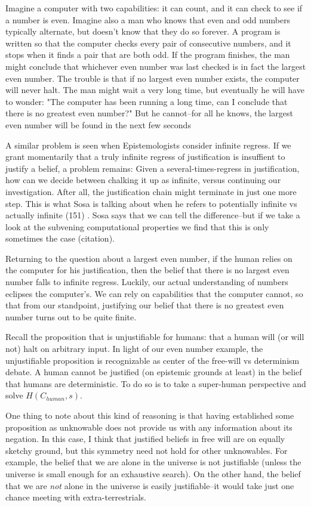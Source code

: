 \documentclass[12pt]{article}
\begin{document}
\begin{flushleft}
Imagine a computer with two capabilities: it can count, and it can check to see if a number is even.
Imagine also a man who knows that even and odd numbers typically alternate, but doesn't know that they do so forever.
A program is written so that the computer checks every pair of consecutive numbers, and it stops when it finds a pair that are both odd.
If the program finishes, the man might conclude that whichever even number was last checked is in fact the largest even number.
The trouble is that if no largest even number exists, the computer will never halt.
The man might wait a very long time, but eventually he will have to wonder: "The computer has been running a long time, can I conclude that there is no greatest even number?"
But he cannot--for all he knows, the largest even number will be found in the next few seconds

A similar problem is seen when Epistemologists consider infinite regress.
If we grant momentarily that a truly infinite regress of justification is insuffient to justify a belief, a problem remains:
Given a several-times-regress in justification, how can we decide between chalking it up as infinite, versus continuing our investigation.
After all, the justification chain might terminate in just one more step.
This is what Sosa is talking about when he refers to potentially infinite vs actually infinite (151) .
Sosa says that we can tell the difference--but if we take a look at the subvening computational properties we find that this is only sometimes the case (citation).

Returning to the question about a largest even number, if the human relies on the computer for his justification, then the belief that there is no largest even number falls to infinite regress.
Luckily, our actual understanding of numbers eclipses the computer's.
We can rely on capabilities that the computer cannot, so that from our standpoint, justifying our belief that there is no greatest even number turns out to be quite finite.

Recall the proposition that is unjustifiable for humans: that a human will (or will not) halt on arbitrary input.
In light of our even number example, the unjustifiable proposition is recognizable as center of the free-will vs determinism debate.
A human cannot be justified (on epistemic grounds at least) in the belief that humans are deterministic.
To do so is to take a super-human perspective and solve $H(C_{human}, s)$\footnotemark.

One thing to note about this kind of reasoning is that having established some proposition as unknowable does not provide us with any information about its negation.
In this case, I think that justified beliefs in free will are on equally sketchy ground\footnotemark, but this symmetry need not hold for other unknowables.
For example, the belief that we are alone in the universe is not justifiable (unless the universe is small enough for an exhaustive search).
On the other hand, the belief that we are \textit{not} alone in the universe is easily justifiable--it would take just one chance meeting with extra-terrestrials.


\end{flushleft}
\end{document}
